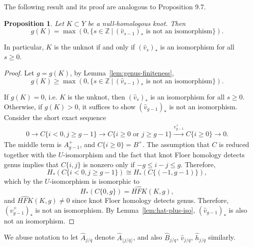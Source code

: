 \documentclass{article}
\newtheorem{proposition}[equation]{Proposition}
\theoremstyle{remark}
\numberwithin{equation}{section}
\numberwithin{table}{section}
\newcommand{\wh}{\widehat}
\renewcommand{\(}{\left(}
\renewcommand{\)}{\right)}
\newcommand{\Z}{{\mathbb{Z}}}
\begin{document}
The following result and its proof are analogous to \cite{oz-sz-rational} Proposition 9.7.
\begin{proposition}\label{prop:genus}
Let $K\subset Y$ be a null-homologous knot. Then
$$g(K)=\max(0,\{s\in\Z\ \vert\ (\wh v_{s-1})_*\text{ is not an isomorphism}\}).$$ 
\end{proposition}
In particular, $K$ is the unknot if and only if $(\wh v_s)_*$ is an isomorphism for all $s\ge 0$.



\begin{proof}
Let $g=g(K)$, by Lemma~\ref{lem:genus-finiteness}, 
$$g(K)\ge\max(0,\{s\in\Z\ \vert\ (\wh v_{s-1})_*\text{ is not an isomorphism}\}).$$ 

If $g(K)=0$, i.e. $K$ is the unknot, then $(\wh v_s)_*$ is an isomorphism for all $s\ge 0$. Otherwise, if $g(K)>0$, it suffices to show $(\wh v_{g-1})_*$ is not an isomorphism. Consider the short exact sequence
\begin{align}\label{ses:v-g-1}
0\to C\{i<0,j\ge g-1\}\to C\{i\ge 0 \text{ or } j\ge g-1\}\xrightarrow{v_{g-1}^+}C\{i\ge 0\}\to 0.
\end{align}
The middle term is $A_{g-1}^+$, and $C\{i\ge 0\}=B^+$. The assumption that $C$ is reduced together with the $U$-isomorphism and the fact that knot Floer homology detects genus implies that $C\{i,j\}$ is nonzero only if $-g\le i-j\le g$. Therefore,
$$H_*(C\{i<0, j\ge g-1\})\cong H_*(C\{(-1,g-1)\}),$$ which by the $U$-isomorphism is isomorphic to $$H_*(C\{0,g\})=\wh{HFK}(K,g),$$ and $\wh{HFK}(K,g)\ne 0$ since knot Floer homology detects genus. Therefore, $(v_{g-1}^+)_*$ is not an isomorphism. By Lemma~\ref{lem:hat-plus-iso}, $(\wh v_{g-1})_*$ is also not an isomorphism.



\end{proof}

We abuse notation to let $\wh A_{j/q}$ denote $\wh A_{\lfloor j/q\rfloor}$, and also $\wh B_{j/q}$, $\wh v_{j/q}$, $\wh h_{j/q}$ similarly.
\end{document}
